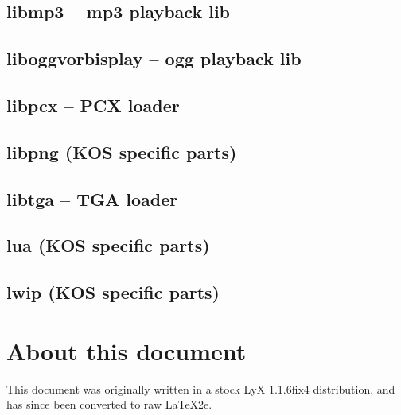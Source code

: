 \documentclass[english]{report}
\begin{document}
\section{libmp3 -- mp3 playback lib}


\section{liboggvorbisplay -- ogg playback lib}


\section{libpcx -- PCX loader}


\section{libpng (KOS specific parts)}


\section{libtga -- TGA loader}


\section{lua (KOS specific parts)}


\section{lwip (KOS specific parts)}



\chapter{About this document}
This document was originally written in a stock LyX 1.1.6fix4 distribution,
and has since been converted to raw LaTeX2e.
\end{document}
